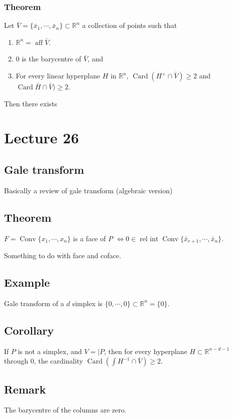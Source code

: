 \documentclass[11pt]{article}
\def\R{\mathbb{R}}
\def\aff{\operatorname{aff}}
\def\relint{\operatorname{rel\ int}}
\def\conv{\operatorname{Conv}}
\def\card{\operatorname{Card}}
\begin{document}
{{{\subsubsection{Theorem}
\label{sec:org9980adf}
Let \(\bar{V} = \{\bar{x}_1, \cdots, \bar{x}_n\} \subset \R^n\) a collection
of points such that

\begin{enumerate}
\item \(\R^n = \aff \bar{V}\).
\item \(0\) is the barycentre of \(\bar{V}\), and
\item For every linear hyperplane \(H\) in \(\R^n\), \(\card(H^{+} \cap \bar{V}) \ge
       2\) and \(\card \bar{H} \cap \bar{V}) \ge 2\).
\end{enumerate}

Then there exists 
\section{Lecture 26}
\label{sec:orgcbe8b26}
\subsection{Gale transform}
\label{sec:orgdc83380}
Basically a review of gale transform (algebraic version)
\subsection{Theorem}
\label{sec:orgc61a09f}
\(F = \conv\{x_1, \cdots, x_n\}\) is a face of \(P\) \(\iff 0 \in \relint \conv
   \{\bar{x}_{r+1}, \cdots, \bar{x}_{n}\}\).

Something to do with face and coface.
\subsection{Example}
\label{sec:org4f244fc}
Gale transform of a \(d\) simplex is \(\{0, \cdots, 0\} \subset \R^n = \{0\}\).
\subsection{Corollary}
\label{sec:orga418b1f}
If \(P\) is not a simplex, and \(V = \vert P\), then for every hyperplane \(H
   \subset \R^{n-d-1}\) through \(0\), the cardinality \(\card (\int H^{-1} \cap
   \bar{V}) \ge 2\).
\subsection{Remark}
\label{sec:orgc0eaede}
The barycentre of the columns are zero.
}}}
\end{document}
